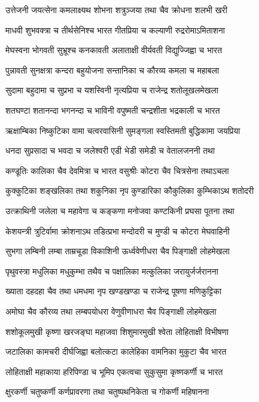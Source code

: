 \twolineshloka
{उत्तेजनी जयत्सेना कमलाक्ष्यथ शोभना}
{शत्रुञ्जया तथा चैव क्रोधना शलभी खरी}


\twolineshloka
{माधवी शुभवक्त्रा च तीर्थसेनिश्च भारत}
{गीतप्रिया च कल्याणी रुद्ररोमाऽमिताशना}


\twolineshloka
{मेघस्वना भोगवती सुभ्रूश्च कनकावती}
{अलाताक्षी वीर्यवती विद्युज्जिह्वा च भारत}


\twolineshloka
{पुन्नावती सुनक्षत्रा कन्दरा बहुयोजना}
{सन्तानिका च कौरव्य कमला च महाबला}


\twolineshloka
{सुदामा बहुदामा च सुप्रभा च यशस्विनी}
{नृत्यप्रिया च राजेन्द्र शतोलूखलमेखला}


\twolineshloka
{शतघण्टा शतानन्दा भगनन्दा च भाविनी}
{वपुष्मती चन्द्रशीता भद्रकाली च भारत}


\twolineshloka
{ऋक्षाम्बिका निष्कुटिका वामा चत्वरवासिनी}
{सुमङ्गला स्वस्तिमती बुद्धिकामा जयप्रिया}


\twolineshloka
{धनदा सुप्रसादा च भवदा च जलेश्वरी}
{एडी भेडी समेडी च वेतालजननी तथा}


\twolineshloka
{कण्डूतिः कालिका चैव देवमित्रा च भारत}
{वसुश्रीः कोटरा चैव चित्रसेना तथाऽचला}


\twolineshloka
{कुक्कुटिका शङ्खलिका तथा शकुनिका नृप}
{कुण्डारिका कौकुलिका कुम्भिकाऽथ शतोदरी}


\twolineshloka
{उत्क्राथिनी जलेला च महावेगा च कङ्कणा}
{मनोजवा कण्टकिनी प्रघसा पूतना तथा}


\twolineshloka
{केशयन्त्री त्रुटिर्वामा क्रोशनाऽथ तडित्प्रभा}
{मन्दोदरी च मुण्डी च कोटरा मेघवाहिनी}


\twolineshloka
{सुभगा लम्बिनी लम्बा ताम्रचूडा विकाशिनी}
{ऊर्ध्ववेणीधरा चैव पिङ्गाक्षी लोहमेखला}


\twolineshloka
{पृथुवस्त्रा मधुलिका मधुकुम्भा तथैव च}
{पक्षालिका मत्कुलिका जरायुर्जर्जरानना}


\twolineshloka
{ख्याता दहदहा चैव तथा धमधमा नृप}
{खण्डखण्डा च राजेन्द्र पूषणा मणिकुट्टिका}


\twolineshloka
{अमोघा चैव कौरव्य तथा लम्बपयोधरा}
{वेणुवीणाधरा चैव पिङ्गाक्षी लोहमेखला}


\twolineshloka
{शशोकूलमुखी कृष्णा खरजङ्घा महाजवा}
{शिशुमारमुखी श्वेता लोहिताक्षी विभीषणा}


\twolineshloka
{जटालिका कामचरी दीर्घजिह्वा बलोत्कटा}
{कालेहिका वामनिका मुकुटा चैव भारत}


\twolineshloka
{लोहिताक्षी महाकाया हरिपिण्डा च भूमिप}
{एकत्वचा सुकुसुमा कृष्णकर्णी च भारत}


\twolineshloka
{क्षुरकर्णी चतुष्कर्णी कर्णप्रावरणा तथा}
{चतुष्पथनिकेता च गोकर्णी महिषानना}


